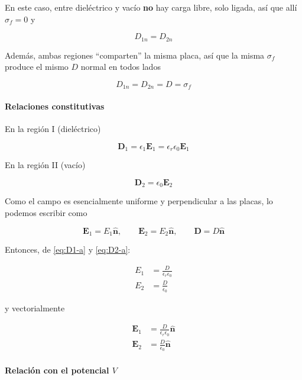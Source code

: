 \documentclass{article}
\begin{document}
En este caso, entre dieléctrico y vacío \textbf{no} hay carga libre, solo ligada, así que allí $\sigma_{f}=0$ y

\[
D_{1n} = D_{2n}
\]

Además, ambas regiones “comparten” la misma placa, así que la misma $\sigma_{f}$ produce el mismo $D$ normal en todos lados

\begin{equation}
D_{1n} = D_{2n} = D = \sigma_{f}
\label{eq:D-serie-a}
\end{equation}

\paragraph{Relaciones constitutivas}

En la región I (dieléctrico)

\begin{equation}
\mathbf{D}_{1} = \epsilon_{1}\mathbf{E}_{1}
= \epsilon_{r}\epsilon_{0}\mathbf{E}_{1}
\label{eq:D1-a}
\end{equation}

En la región II (vacío)

\begin{equation}
\mathbf{D}_{2} = \epsilon_{0}\mathbf{E}_{2}
\label{eq:D2-a}
\end{equation}

Como el campo es esencialmente uniforme y perpendicular a las placas, lo podemos escribir como

\[
\mathbf{E}_{1} = E_{1}\hat{\mathbf{n}},
\qquad
\mathbf{E}_{2} = E_{2}\hat{\mathbf{n}},
\qquad
\mathbf{D} = D\hat{\mathbf{n}}
\]

Entonces, de \eqref{eq:D1-a} y \eqref{eq:D2-a}:

\begin{align}
E_{1} &= \frac{D}{\epsilon_{r}\epsilon_{0}}
\label{eq:E1-a}\\[4pt]
E_{2} &= \frac{D}{\epsilon_{0}}
\label{eq:E2-a}
\end{align}

y vectorialmente

\begin{align}
\mathbf{E}_{1} &= \frac{D}{\epsilon_{r}\epsilon_{0}}\hat{\mathbf{n}}
\label{eq:E1-a-vec}\\[4pt]
\mathbf{E}_{2} &= \frac{D}{\epsilon_{0}}\hat{\mathbf{n}}
\label{eq:E2-a-vec}
\end{align}

\paragraph{Relación con el potencial $V$}
\end{document}
